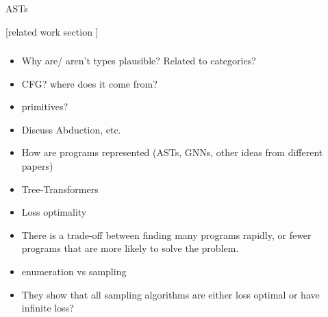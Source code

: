 
\cite{gulwani_program_2017}

ASTs
\cite{oliveira_abstract_2013}
\cite{zhang_novel_2019}



[related work section ]








\subsubsection{}
\begin{itemize}
    \item Why are/ aren't types plausible? Related to categories?
    \item CFG? where does it come from?
    \item primitives?
    \item Discuss Abduction, etc. 
\end{itemize}



\begin{itemize}
    \item How are programs represented (ASTs, GNNs, other ideas from different papers)
    \item Tree-Transformers
\end{itemize}











\begin{itemize}
    \item Loss optimality
    \item There is a trade-off between finding many programs rapidly, or fewer programs that are more likely to solve the problem.
    \item enumeration vs sampling
    \item They show that all sampling algorithms are either loss optimal or have infinite loss?
\end{itemize}



















